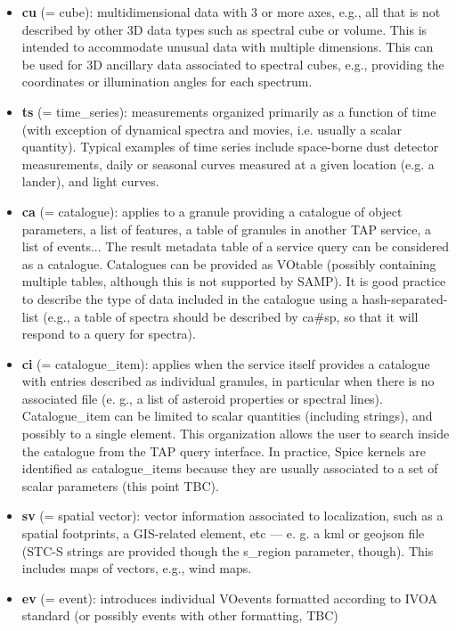 \documentclass[11pt,a4paper]{ivoa}
\begin{document}
\begin{itemize}
\item \textbf{cu }(= cube): multidimensional data with 3 or more axes, e.g., all that is not described by other 3D data types such as spectral cube or volume. This is intended to accommodate unusual data with multiple dimensions. This can be used for 3D ancillary data associated to spectral cubes, e.g., providing the coordinates or illumination angles for each spectrum.
\item \textbf{ts }(= time\_series): measurements organized primarily as a function of time (with exception of dynamical spectra and movies, i.e. usually a scalar quantity). Typical examples of time series include space-borne dust detector measurements, daily or seasonal curves measured at a given location (e.g. a lander), and light curves.
\item \textbf{ca }(= catalogue): applies to a granule providing a catalogue of object parameters, a list of features, a table of granules in another TAP service, a list of events... The result metadata table of a service query can be considered as a catalogue. Catalogues can be provided as VOtable (possibly containing multiple tables, although this is not supported by SAMP). It is good practice to describe the type of data included in the catalogue using a hash-separated-list (e.g., a table of spectra should be described by ca\#sp, so that it will respond to a query for spectra).
\item \textbf{ci }(= catalogue\_item): applies when the service itself provides a catalogue with entries described as individual granules, in particular when there is no associated file (e. g., a list of asteroid properties or spectral lines). Catalogue\_item can be limited to scalar quantities (including strings), and possibly to a single element. This organization allows the user to search inside the catalogue from the TAP query interface. In practice, Spice kernels are identified as catalogue\_items because they are usually associated to a set of scalar parameters (this point TBC).
\item \textbf{sv} (= spatial vector): vector information associated to localization, such as a spatial footprints, a GIS-related element, etc —  e. g. a kml or geojson file (STC-S strings are provided though the s\_region parameter, though). This includes maps of vectors, e.g., wind maps.
\item \textbf{ev} (= event): introduces individual VOevents formatted according to IVOA standard (or possibly events with other formatting, TBC)
\end{itemize}
\end{document}
